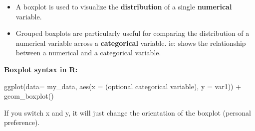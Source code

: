 \documentclass[
  letterpaper,
  DIV=11,
  numbers=noendperiod]{scrreprt}
\newenvironment{Shaded}{\begin{snugshade}}{\end{snugshade}}
\newcommand{\AttributeTok}[1]{\textcolor[rgb]{0.40,0.45,0.13}{#1}}
\newcommand{\FunctionTok}[1]{\textcolor[rgb]{0.28,0.35,0.67}{#1}}
\newcommand{\NormalTok}[1]{\textcolor[rgb]{0.00,0.23,0.31}{#1}}
\newcommand{\SpecialCharTok}[1]{\textcolor[rgb]{0.37,0.37,0.37}{#1}}
\begin{document}
\begin{tcolorbox}[enhanced jigsaw, colframe=quarto-callout-note-color-frame, breakable, colback=white, toprule=.15mm, leftrule=.75mm, left=2mm, opacityback=0, rightrule=.15mm, arc=.35mm, bottomrule=.15mm]

\begin{itemize}
\item
  A boxplot is used to visualize the \textbf{distribution} of a single
  \textbf{numerical} variable.
\item
  Grouped boxplots are particularly useful for comparing the
  distribution of a numerical variable across a \textbf{categorical}
  variable. ie: shows the relationship between a numerical and a
  categorical variable.
\end{itemize}

\textbf{Boxplot syntax in R:}

\begin{Shaded}
\begin{Highlighting}[]
\FunctionTok{ggplot}\NormalTok{(}\AttributeTok{data=}\NormalTok{ my\_data, }\FunctionTok{aes}\NormalTok{(}\AttributeTok{x =}\NormalTok{ (optional categorical variable),  }\AttributeTok{y =}\NormalTok{ var1)) }\SpecialCharTok{+}
  \FunctionTok{geom\_boxplot}\NormalTok{()}
\end{Highlighting}
\end{Shaded}

If you switch x and y, it will just change the orientation of the
boxplot (personal preference).

\end{tcolorbox}
\end{document}
